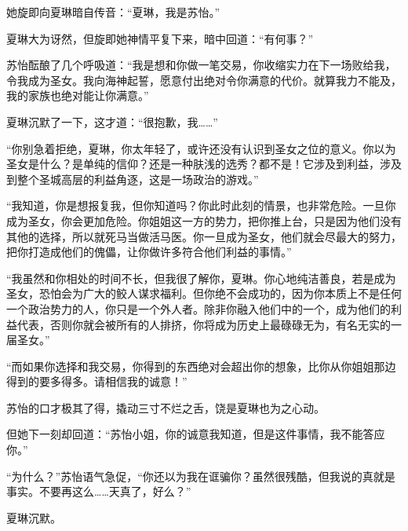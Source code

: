 \begin{this_body}
她旋即向夏琳暗自传音：“夏琳，我是苏怡。”

夏琳大为讶然，但旋即她神情平复下来，暗中回道：“有何事？”

苏怡酝酿了几个呼吸道：“我是想和你做一笔交易，你收缩实力在下一场败给我，令我成为圣女。我向海神起誓，愿意付出绝对令你满意的代价。就算我力不能及，我的家族也绝对能让你满意。”

夏琳沉默了一下，这才道：“很抱歉，我……”

“你别急着拒绝，夏琳，你太年轻了，或许还没有认识到圣女之位的意义。你以为圣女是什么？是单纯的信仰？还是一种肤浅的选秀？都不是！它涉及到利益，涉及到整个圣城高层的利益角逐，这是一场政治的游戏。”

“我知道，你是想报复我，但你知道吗？你此时此刻的情景，也非常危险。一旦你成为圣女，你会更加危险。你姐姐这一方的势力，把你推上台，只是因为他们没有其他的选择，所以就死马当做活马医。你一旦成为圣女，他们就会尽最大的努力，把你打造成他们的傀儡，让你做许多符合他们利益的事情。”

“我虽然和你相处的时间不长，但我很了解你，夏琳。你心地纯洁善良，若是成为圣女，恐怕会为广大的鲛人谋求福利。但你绝不会成功的，因为你本质上不是任何一个政治势力的人，你只是一个外人者。除非你融入他们中的一个，成为他们的利益代表，否则你就会被所有的人排挤，你将成为历史上最碌碌无为，有名无实的一届圣女。”

“而如果你选择和我交易，你得到的东西绝对会超出你的想象，比你从你姐姐那边得到的要多得多。请相信我的诚意！”

苏怡的口才极其了得，撬动三寸不烂之舌，饶是夏琳也为之心动。

但她下一刻却回道：“苏怡小姐，你的诚意我知道，但是这件事情，我不能答应你。”

“为什么？”苏怡语气急促，“你还以为我在诓骗你？虽然很残酷，但我说的真就是事实。不要再这么……天真了，好么？”

夏琳沉默。

\end{this_body}

